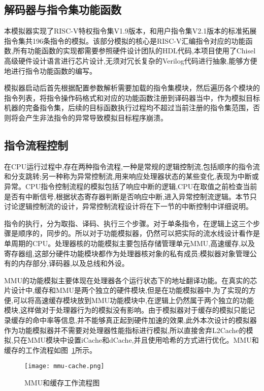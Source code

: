 \subsection{解码器与指令集功能函数}
本模拟器实现了RISC-V特权指令集V1.9版本，和用户指令集V2.1版本的标准拓展指令集共196条指令的模拟。该部分模拟的核心是RISC-V汇编指令对应的功能函数,所有功能函数的实现都需要参照硬件设计团队的HDL代码,本项目使用了Chisel高级硬件设计语言进行芯片设计,无须对冗长复杂的Verilog代码进行抽象,能够方便地进行指令功能函数的编写。


模拟器启动后首先根据配置参数解析需要加载的指令集模块，然后遍历各个模块的指令列表，将指令操作码格式和对应的功能函数注册到译码器当中，作为模拟目标机器的完备指令集，后续的目标函数执行过程均不超过当前注册的指令集范围，否则将会产生非法指令的异常导致模拟目标程序崩溃。


\subsection{指令流程控制}
在CPU运行过程中,存在两种指令流程,一种是常规的逻辑控制流,包括顺序的指令流和分支跳转;另一种称为异常控制流,用来响应处理器状态的某些变化,表现为中断或异常。CPU指令控制流程的模拟包括了响应中断的逻辑,CPU在取值之前检查当前是否有中断信号,根据状态寄存器判断是否响应中断,进入异常控制流逻辑。本节只讨论逻辑控制流的设计，异常控制流程设计将在下一节的中断控制中详细说明。


指令的执行，分为取指、译码、执行三个步骤。对于单条指令，在逻辑上这三个步骤是顺序的，同步的。所以对于功能模拟器，仍然可以把实际的流水线设计看作是单周期的CPU。处理器核的功能模拟主要包括存储管理单元MMU,高速缓存,以及寄存器组,这部分硬件功能模块都作为处理器核对象的私有成员;模拟器对象管理公有的内存部分,译码器,以及总线和外设。


MMU的功能模拟主要体现在处理器各个运行状态下的地址翻译功能。在真实的芯片设计中,缓存和MMU是两个独立的硬件模块,但是在功能模拟器中,为了实现的方便,可以将高速缓存模块放到MMU功能模块中,在逻辑上仍然属于两个独立的功能模块,这样做对于处理器行为的模拟没有影响。由于模拟器对于缓存的模拟只能记录缓存的命中率等信息,并不能够真正起到硬件加速的效果,此外本次设计的模拟器作为功能模拟器并不需要对处理器性能指标进行模拟,所以直接舍弃L2Cache的模拟,只在MMU模块中设置iCache和dCache,并且使用哈希的方式进行优化。MMU和缓存的工作流程如图~\ref{fig:mmu-process}所示。
\begin{figure}[H]
  \centering
  \texttt{[image: mmu-cache.png]}
  \caption{MMU和缓存工作流程图}
  \label{fig:mmu-process}
\end{figure}


